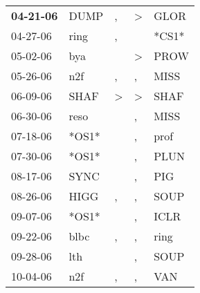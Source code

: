\begin{supertabular}{p{0.07\textwidth}p{0.06\textwidth}p{0.02\textwidth}p{0.02\textwidth}p{0.06\textwidth}}
 \textbf{04-21-06\textsuperscript{}} &           DUMP\textsuperscript{} &                , &     \textgreater &           GLOR\textsuperscript{} \\
          04-27-06\textsuperscript{} &           ring\textsuperscript{} &                , &                  &                            *CS1* \\
          05-02-06\textsuperscript{} &            bya\textsuperscript{} &                  &     \textgreater &           PROW\textsuperscript{} \\
          05-26-06\textsuperscript{} &            n2f\textsuperscript{} &                , &                , &           MISS\textsuperscript{} \\
          06-09-06\textsuperscript{} &           SHAF\textsuperscript{} &     \textgreater &     \textgreater &           SHAF\textsuperscript{} \\
          06-30-06\textsuperscript{} &           reso\textsuperscript{} &                  &                , &           MISS\textsuperscript{} \\
          07-18-06\textsuperscript{} &                            *OS1* &                  &                , &           prof\textsuperscript{} \\
          07-30-06\textsuperscript{} &                            *OS1* &                  &                , &           PLUN\textsuperscript{} \\
          08-17-06\textsuperscript{} &           SYNC\textsuperscript{} &                  &                , &            PIG\textsuperscript{} \\
          08-26-06\textsuperscript{} &           HIGG\textsuperscript{} &                , &                , &           SOUP\textsuperscript{} \\
          09-07-06\textsuperscript{} &                            *OS1* &                  &                , &           ICLR\textsuperscript{} \\
          09-22-06\textsuperscript{} &           blbc\textsuperscript{} &                , &                , &           ring\textsuperscript{} \\
          09-28-06\textsuperscript{} &            lth\textsuperscript{} &                  &                , &           SOUP\textsuperscript{} \\
          10-04-06\textsuperscript{} &            n2f\textsuperscript{} &                , &                , &            VAN\textsuperscript{} \\

\end{supertabular}
